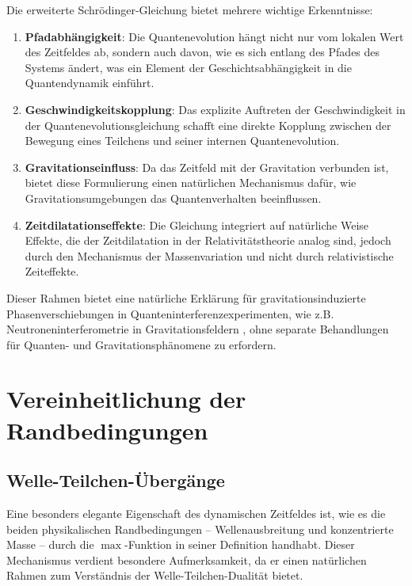 \documentclass[12pt,a4paper]{article}
\begin{document}
	Die erweiterte Schrödinger-Gleichung bietet mehrere wichtige Erkenntnisse:
	
	\begin{enumerate}
		\item \textbf{Pfadabhängigkeit}: Die Quantenevolution hängt nicht nur vom lokalen Wert des Zeitfeldes ab, sondern auch davon, wie es sich entlang des Pfades des Systems ändert, was ein Element der Geschichtsabhängigkeit in die Quantendynamik einführt.
		
		\item \textbf{Geschwindigkeitskopplung}: Das explizite Auftreten der Geschwindigkeit in der Quantenevolutionsgleichung schafft eine direkte Kopplung zwischen der Bewegung eines Teilchens und seiner internen Quantenevolution.
		
		\item \textbf{Gravitationseinfluss}: Da das Zeitfeld mit der Gravitation verbunden ist, bietet diese Formulierung einen natürlichen Mechanismus dafür, wie Gravitationsumgebungen das Quantenverhalten beeinflussen.
		
		\item \textbf{Zeitdilatationseffekte}: Die Gleichung integriert auf natürliche Weise Effekte, die der Zeitdilatation in der Relativitätstheorie analog sind, jedoch durch den Mechanismus der Massenvariation und nicht durch relativistische Zeiteffekte.
	\end{enumerate}
	
	Dieser Rahmen bietet eine natürliche Erklärung für gravitationsinduzierte Phasenverschiebungen in Quanteninterferenzexperimenten, wie z.B. Neutroneninterferometrie in Gravitationsfeldern \cite{Colella1975}, ohne separate Behandlungen für Quanten- und Gravitationsphänomene zu erfordern.
	
	\section{Vereinheitlichung der Randbedingungen}
	\label{sec:boundary_conditions}
	
	\subsection{Welle-Teilchen-Übergänge}
	\label{subsec:wave_particle}
	
	Eine besonders elegante Eigenschaft des dynamischen Zeitfeldes ist, wie es die beiden physikalischen Randbedingungen – Wellenausbreitung und konzentrierte Masse – durch die $\max$-Funktion in seiner Definition handhabt. Dieser Mechanismus verdient besondere Aufmerksamkeit, da er einen natürlichen Rahmen zum Verständnis der Welle-Teilchen-Dualität bietet.
	
\end{document}
